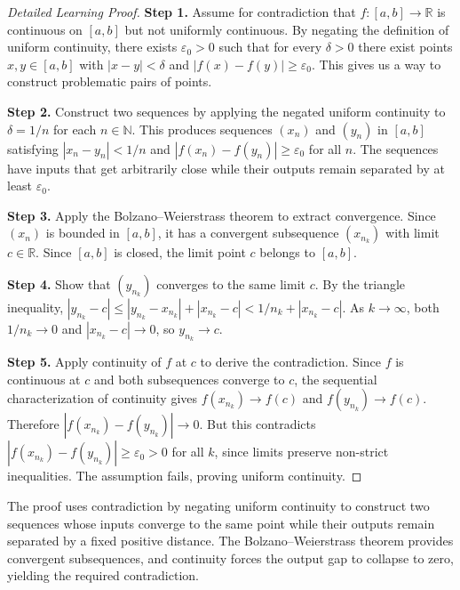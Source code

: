 \begin{proof}[Detailed Learning Proof]
\LRAProofBodyStart

\textbf{Step 1.} Assume for contradiction that $f \colon [a,b] \to \mathbb{R}$ is continuous on $[a,b]$ but not uniformly continuous. By negating the definition of uniform continuity, there exists $\varepsilon_{0} > 0$ such that for every $\delta > 0$ there exist points $x, y \in [a,b]$ with $|x - y| < \delta$ and $|f(x) - f(y)| \geq \varepsilon_{0}$. This gives us a way to construct problematic pairs of points.

\textbf{Step 2.} Construct two sequences by applying the negated uniform continuity to $\delta = 1/n$ for each $n \in \mathbb{N}$. This produces sequences $(x_{n})$ and $(y_{n})$ in $[a,b]$ satisfying $|x_{n} - y_{n}| < 1/n$ and $|f(x_{n}) - f(y_{n})| \geq \varepsilon_{0}$ for all $n$. The sequences have inputs that get arbitrarily close while their outputs remain separated by at least $\varepsilon_{0}$.

\textbf{Step 3.} Apply the Bolzano--Weierstrass theorem to extract convergence. Since $(x_{n})$ is bounded in $[a,b]$, it has a convergent subsequence $(x_{n_{k}})$ with limit $c \in \mathbb{R}$. Since $[a,b]$ is closed, the limit point $c$ belongs to $[a,b]$.

\textbf{Step 4.} Show that $(y_{n_{k}})$ converges to the same limit $c$. By the triangle inequality, $|y_{n_{k}} - c| \leq |y_{n_{k}} - x_{n_{k}}| + |x_{n_{k}} - c| < 1/n_{k} + |x_{n_{k}} - c|$. As $k \to \infty$, both $1/n_{k} \to 0$ and $|x_{n_{k}} - c| \to 0$, so $y_{n_{k}} \to c$.

\textbf{Step 5.} Apply continuity of $f$ at $c$ to derive the contradiction. Since $f$ is continuous at $c$ and both subsequences converge to $c$, the sequential characterization of continuity gives $f(x_{n_{k}}) \to f(c)$ and $f(y_{n_{k}}) \to f(c)$. Therefore $|f(x_{n_{k}}) - f(y_{n_{k}})| \to 0$. But this contradicts $|f(x_{n_{k}}) - f(y_{n_{k}})| \geq \varepsilon_{0} > 0$ for all $k$, since limits preserve non-strict inequalities. The assumption fails, proving uniform continuity.
\end{proof}

\begin{remark*}
The proof uses contradiction by negating uniform continuity to construct two sequences whose inputs converge to the same point while their outputs remain separated by a fixed positive distance. The Bolzano--Weierstrass theorem provides convergent subsequences, and continuity forces the output gap to collapse to zero, yielding the required contradiction.
\end{remark*}

